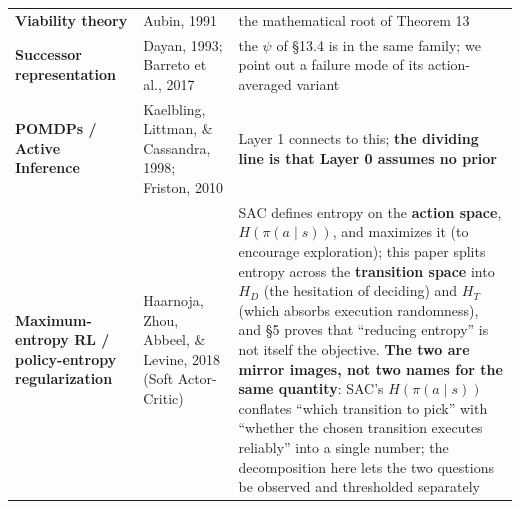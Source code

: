 \documentclass[11pt]{article}
\begin{document}
\begin{longtable}[]{@{}lll@{}}
\begin{minipage}[t]{0.30\columnwidth}\raggedright
\textbf{Viability theory}\strut
\end{minipage} & \begin{minipage}[t]{0.30\columnwidth}\raggedright
Aubin, 1991\strut
\end{minipage} & \begin{minipage}[t]{0.30\columnwidth}\raggedright
the mathematical root of Theorem 13\strut
\end{minipage}\tabularnewline
\begin{minipage}[t]{0.30\columnwidth}\raggedright
\textbf{Successor representation}\strut
\end{minipage} & \begin{minipage}[t]{0.30\columnwidth}\raggedright
Dayan, 1993; Barreto et al., 2017\strut
\end{minipage} & \begin{minipage}[t]{0.30\columnwidth}\raggedright
the \(\psi\) of \S{}13.4 is in the same family; we point out a failure mode of its action-averaged variant\strut
\end{minipage}\tabularnewline
\begin{minipage}[t]{0.30\columnwidth}\raggedright
\textbf{POMDPs / Active Inference}\strut
\end{minipage} & \begin{minipage}[t]{0.30\columnwidth}\raggedright
Kaelbling, Littman, \& Cassandra, 1998; Friston, 2010\strut
\end{minipage} & \begin{minipage}[t]{0.30\columnwidth}\raggedright
Layer 1 connects to this; \textbf{the dividing line is that Layer 0 assumes no prior}\strut
\end{minipage}\tabularnewline
\begin{minipage}[t]{0.30\columnwidth}\raggedright
\textbf{Maximum-entropy RL / policy-entropy regularization}\strut
\end{minipage} & \begin{minipage}[t]{0.30\columnwidth}\raggedright
Haarnoja, Zhou, Abbeel, \& Levine, 2018 (Soft Actor-Critic)\strut
\end{minipage} & \begin{minipage}[t]{0.30\columnwidth}\raggedright
SAC defines entropy on the \textbf{action space}, \(H(\pi(a\mid s))\), and maximizes it (to encourage exploration); this paper splits entropy across the \textbf{transition space} into \(H_D\) (the hesitation of deciding) and \(H_T\) (which absorbs execution randomness), and \S{}5 proves that ``reducing entropy'' is not itself the objective. \textbf{The two are mirror images, not two names for the same quantity}: SAC's \(H(\pi(a\mid s))\) conflates ``which transition to pick'' with ``whether the chosen transition executes reliably'' into a single number; the decomposition here lets the two questions be observed and thresholded separately\strut
\end{minipage}\tabularnewline
\bottomrule
\end{longtable}
\end{document}
